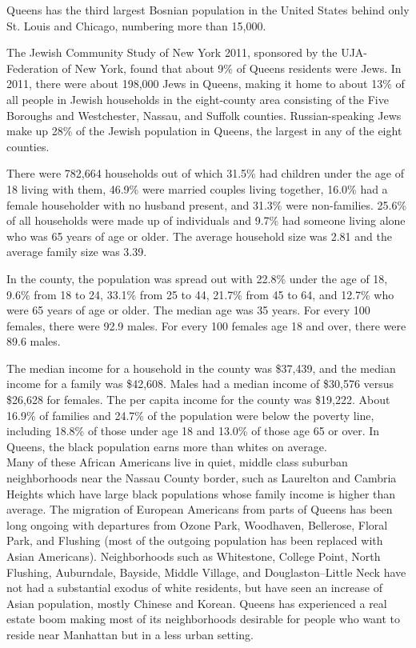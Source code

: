 Queens has the third largest Bosnian population in the United States
behind only St. Louis and Chicago, numbering more than 15,000.

The Jewish Community Study of New York 2011, sponsored by the
UJA-Federation of New York, found that about 9\% of Queens residents
were Jews. In 2011, there were about 198,000 Jews in Queens, making it
home to about 13\% of all people in Jewish households in the
eight-county area consisting of the Five Boroughs and Westchester,
Nassau, and Suffolk counties. Russian-speaking Jews make up 28\% of the
Jewish population in Queens, the largest in any of the eight counties.

There were 782,664 households out of which 31.5\% had children under the
age of 18 living with them, 46.9\% were married couples living together,
16.0\% had a female householder with no husband present, and 31.3\% were
non-families. 25.6\% of all households were made up of individuals and
9.7\% had someone living alone who was 65 years of age or older. The
average household size was 2.81 and the average family size was 3.39.

In the county, the population was spread out with 22.8\% under the age
of 18, 9.6\% from 18 to 24, 33.1\% from 25 to 44, 21.7\% from 45 to 64,
and 12.7\% who were 65 years of age or older. The median age was 35
years. For every 100 females, there were 92.9 males. For every 100
females age 18 and over, there were 89.6 males.

The median income for a household in the county was \$37,439, and the
median income for a family was \$42,608. Males had a median income of
\$30,576 versus \$26,628 for females. The per capita income for the
county was \$19,222. About 16.9\% of families and 24.7\% of the
population were below the poverty line, including 18.8\% of those under
age 18 and 13.0\% of those age 65 or over. In Queens, the black
population earns more than whites on average.\\
Many of these African Americans live in quiet, middle class suburban
neighborhoods near the Nassau County border, such as Laurelton and
Cambria Heights which have large black populations whose family income
is higher than average. The migration of European Americans from parts
of Queens has been long ongoing with departures from Ozone Park,
Woodhaven, Bellerose, Floral Park, and Flushing (most of the outgoing
population has been replaced with Asian Americans). Neighborhoods such
as Whitestone, College Point, North Flushing, Auburndale, Bayside,
Middle Village, and Douglaston--Little Neck have not had a substantial
exodus of white residents, but have seen an increase of Asian
population, mostly Chinese and Korean. Queens has experienced a real
estate boom making most of its neighborhoods desirable for people who
want to reside near Manhattan but in a less urban setting.

